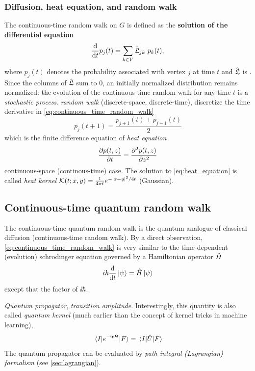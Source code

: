 \subsubsection{Diffusion, heat equation, and random walk}
The continuous-time random walk on $G$ is defined as the \textbf{solution of the differential equation}
\begin{equation}
	\dv{t} p_j(t)
	=
	\sum_{k\in V} \hat{\mathfrak{L}}_{jk} \ p_k(t),
	\label{eq:continuous_time_random_walk}
\end{equation}
where $p_j(t)$ denotes the probability associated with vertex $j$ at time $t$
and $\hat{\mathfrak{L}}$ is .
Since the columns of $\hat{\mathfrak{L}}$ sum to 0,
an initially normalized distribution remains normalized:
the evolution of the continuous-time random walk for any time $t$ is a \emph{stochastic process}.
\emph{random walk} (discrete-space, discrete-time), 
discretize the time derivative in \cref{eq:continuous_time_random_walk}
\begin{equation}
	p_j(t+1) = \frac{p_{j+1}(t) + p_{j-1}(t)}{2} 
\end{equation}
which is the finite difference equation of \emph{heat equation} 
\begin{equation}
	\pdv{p(t,z)}{t} = \pdv{ ^2 p(t,z)}{z^2}
	\label{eq:heat_equation}
\end{equation}
continuous-space (continous-time) case.
The solution to \cref{eq:heat_equation} is called \emph{heat kernel} $\mathcal{K}(t;x,y)=\frac{1}{4\pi t} e^{-\abs{x-y}^2/4t}$ (Gaussian).

\subsection{Continuous-time quantum random walk}\label{sec:ct_quantum_walk}
The continuous-time quantum random walk \cite{childsExampleDifferenceQuantum2002} is the quantum analogue of classical diffusion (continuous-time random walk).
By a direct observation, \cref{eq:continuous_time_random_walk} is very similar to the time-dependent (evolution) schrodinger equation governed by a Hamiltonian operator $\hat{H}$
\begin{equation}
	i\hbar \dv{t} \ket{\psi} = \hat{H} \ket{\psi}
	\label{eq:evolution}
\end{equation}
except that the factor of $\ii\hbar$.
\begin{definition}\label{def:quantum_propagator}
	\emph{Quantum propagator}, \emph{transition amplitude}.
	Interestingly, this quantity is also called \emph{quantum kernel} (much earlier than the concept of kernel tricks in machine learning), 
	\begin{equation}
		\mel{I}{e^{-\textup{i}t \hat{H}}}{F}
		=
		\mel{I}{\hat{U}}{F}
	\end{equation}
	The quantum propagator can be evaluated by \emph{path integral (Lagrangian) formalism} (see \cref{sec:lagrangian}).
\end{definition}


